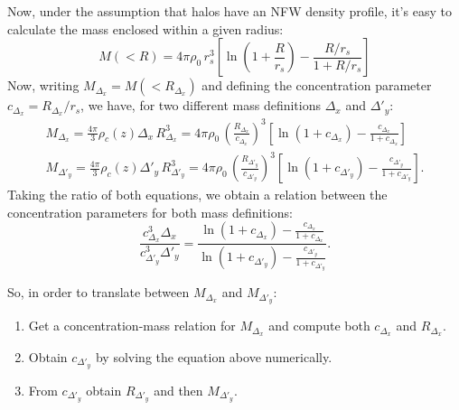 \documentclass{article}
\begin{document}
  Now, under the assumption that halos have an NFW density profile, it's easy to calculate the mass enclosed within a given radius:
  \begin{equation}
    M(<R)=4\pi\rho_0\,r_s^3\left[\ln\left(1+\frac{R}{r_s}\right)-\frac{R/r_s}{1+R/r_s}\right]
  \end{equation}
  Now, writing $M_{\Delta_x}=M(<R_{\Delta_x})$ and defining the concentration parameter $c_{\Delta_x}=R_{\Delta_x}/r_s$, we have, for two different mass definitions $\Delta_x$ and $\Delta'_y$:
  \begin{align}
    M_{\Delta_x}=\frac{4\pi}{3}\rho_c(z)\Delta_x\,R_{\Delta_x}^3=4\pi\rho_0\,\left(\frac{R_{\Delta_x}}{c_{\Delta_x}}\right)^3\left[\ln\left(1+c_{\Delta_x}\right)-\frac{c_{\Delta_x}}{1+c_{\Delta_x}}\right]\\
    M_{\Delta'_y}=\frac{4\pi}{3}\rho_c(z)\Delta'_y\,R_{\Delta'_y}^3=4\pi\rho_0\,\left(\frac{R_{\Delta'_y}}{c_{\Delta'_y}}\right)^3\left[\ln\left(1+c_{\Delta'_y}\right)-\frac{c_{\Delta'_y}}{1+c_{\Delta'_y}}\right].
  \end{align}
  Taking the ratio of both equations, we obtain a relation between the concentration parameters for both mass definitions:
  \begin{equation}
    \frac{c_{\Delta_x}^3\Delta_x}{c_{\Delta'_y}^3\Delta'_y}=\frac{\ln\left(1+c_{\Delta_x}\right)-\frac{c_{\Delta_x}}{1+c_{\Delta_x}}}{\ln\left(1+c_{\Delta'_y}\right)-\frac{c_{\Delta'_y}}{1+c_{\Delta'_y}}}.
  \end{equation}

  So, in order to translate between $M_{\Delta_x}$ and $M_{\Delta'_y}$:
  \begin{enumerate}
    \item Get a concentration-mass relation for $M_{\Delta_x}$ and compute both $c_{\Delta_x}$ and $R_{\Delta_x}$.
    \item Obtain $c_{\Delta'_y}$ by solving the equation above numerically.
    \item From $c_{\Delta'_y}$ obtain $R_{\Delta'_y}$ and then $M_{\Delta'_y}$.
  \end{enumerate}
\end{document}
